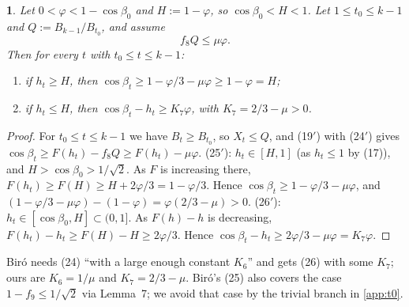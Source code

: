 \documentclass[11pt]{amsart}
\theoremstyle{remark}
\theoremstyle{plain}
\newtheorem*{namedthm*}{\protect\mythmname}
\newcommand{\mythmname}{}
\newenvironment{named}[1]{\renewcommand{\mythmname}{#1}\begin{namedthm*}}{\end{namedthm*}}
\begin{document}
\begin{named}{Lemma 8a (cases (25), (26))}
Let $0<\varphi<1-\cos\beta_0$ and $H:=1-\varphi$, so $\cos\beta_0<H<1$. Let $1\le t_0\le k-1$ and $Q:=B_{k-1}/B_{t_0}$, and assume
\begin{equation}\tag{24$'$}
f_8Q\le\mu\varphi .
\end{equation}
Then for every $t$ with $t_0\le t\le k-1$:
\begin{enumerate}[label=\textup{(\arabic*$'$)},start=25,leftmargin=*]
\item if $h_t\ge H$, then $\cos\beta_t\ge1-\varphi/3-\mu\varphi\ge1-\varphi=H$;
\item if $h_t\le H$, then $\cos\beta_t-h_t\ge K_7\varphi$, with $K_7=2/3-\mu>0$.
\end{enumerate}
\end{named}
\begin{proof}
For $t_0\le t\le k-1$ we have $B_t\ge B_{t_0}$, so $X_t\le Q$, and (19$'$) with (24$'$) gives $\cos\beta_t\ge F(h_t)-f_8Q\ge F(h_t)-\mu\varphi$.
(25$'$): $h_t\in[H,1]$ (as $h_t\le1$ by (17)), and $H>\cos\beta_0>1/\sqrt2$. As $F$ is increasing there, $F(h_t)\ge F(H)\ge H+2\varphi/3=1-\varphi/3$. Hence $\cos\beta_t\ge1-\varphi/3-\mu\varphi$, and $(1-\varphi/3-\mu\varphi)-(1-\varphi)=\varphi(2/3-\mu)>0$.
(26$'$): $h_t\in[\cos\beta_0,H]\subset(0,1]$. As $F(h)-h$ is decreasing, $F(h_t)-h_t\ge F(H)-H\ge2\varphi/3$. Hence $\cos\beta_t-h_t\ge2\varphi/3-\mu\varphi=K_7\varphi$.
\end{proof}
Bir\'o needs (24) ``with a large enough constant $K_6$'' and gets (26) with some $K_7$; ours are $K_6=1/\mu$ and $K_7=2/3-\mu$. Bir\'o's (25) also covers the case $1-f_9\le1/\sqrt2$ via Lemma~7; we avoid that case by the trivial branch in \ref{app:t0}.

\end{document}
